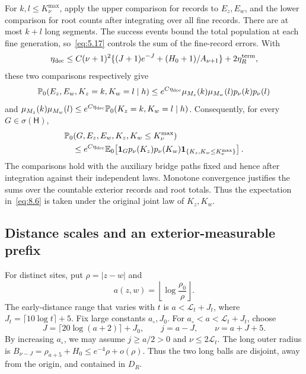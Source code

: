 \documentclass[11pt,letterpaper,reqno]{amsart}
\numberwithin{equation}{section}
\theoremstyle{remark}
\begin{document}
For $k,l\le K_\nu^{\max}$, apply the upper comparison for records to $E_z,E_w$, and the lower comparison for root counts after integrating over all fine records. There are at most $k+l$ long segments. The success events bound the total population at each fine generation, so~\eqref{eq:5.17} controls the sum of the fine-record errors. With
\begin{equation}\label{eq:8.5}
 \eta_{\rm dec}\le C(\nu+1)^2
 \{(J+1)e^{-J}+(H_0+1)/A_{\nu+1}\}+2\eta_R^{\rm term},
\end{equation}
these two comparisons respectively give
\[
 \mathbb P_0(E_z,E_w,K_z=k,K_w=l\mid h)
 \le e^{C\eta_{\rm dec}}\mu_{M_z}(k)\mu_{M_w}(l)p_\nu(k)p_\nu(l)
\]
and $\mu_{M_z}(k)\mu_{M_w}(l)\le e^{C\eta_{\rm dec}}\mathbb P_0(K_z=k,K_w=l\mid h)$.
Consequently, for every $G\in\sigma(\mathsf H)$,
\begin{equation}\label{eq:8.6}
\begin{split}
 &\mathbb P_0(G,E_z,E_w,K_z,K_w\le K_\nu^{\max})\\
 &\quad\le e^{C\eta_{\rm dec}}\mathbb E_0\!\left[
 \mathbf1_Gp_\nu(K_z)p_\nu(K_w)
 \mathbf1_{\{K_z,K_w\le K_\nu^{\max}\}}\right].
\end{split}
\end{equation}
The comparisons hold with the auxiliary bridge paths fixed and hence after integration against their independent laws. Monotone convergence justifies the sums over the countable exterior records and root totals. Thus the expectation in~\eqref{eq:8.6} is taken under the original joint law of $K_z,K_w$.

\subsection{Distance scales and an exterior-measurable prefix}\label{sec:earlygeometry}
For distinct sites, put $\rho=|z-w|$ and
\begin{equation}\label{eq:8.7}
a(z,w)=\left\lfloor\log\frac{\rho_0}{\rho}\right\rfloor.
\end{equation}
The early-distance range that varies with $t$ is $a<\mathcal L_t+J_t$, where
$J_t=\lceil10\log t\rceil+5$. Fix large constants $a_\circ,J_0$. For
$a_\circ<a<\mathcal L_t+J_t$, choose
\begin{equation}\label{eq:8.8}
J=\lceil20\log(a+2)\rceil+J_0,\qquad
j=a-J,\qquad \nu=a+J+5.
\end{equation}
By increasing $a_\circ$, we may assume $j\ge a/2>0$ and $\nu\le2\mathcal L_t$. The long outer radius is
$B_{\nu-J}=\rho_{a+5}+H_0\le e^{-4}\rho+o(\rho)$.
Thus the two long balls are disjoint, away from the origin, and contained in $D_R$.
\end{document}
